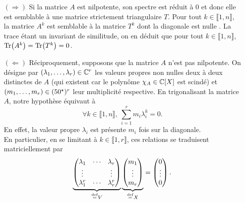 \begin{demo}
    \begin{itemize}
        \item[$(\Rightarrow)$] Si la matrice $A$ est nilpotente, son spectre est réduit à $0$ et donc elle est semblable à une matrice strictement triangulaire $T$. Pour tout $k \in \llbracket 1, n \rrbracket$, la matrice $A^k$ est semblable à la matrice $T^k$ dont la diagonale est nulle \note. La trace étant un invariant de similitude, on en déduit que pour tout $k \in \llbracket 1, n \rrbracket$, $\Tr(A^k) = \Tr(T^k) = 0$.
        \item[$(\Leftarrow)$] Réciproquement, supposons que la matrice $A$ n'est pas nilpotente. On désigne par $(\lambda_1, \dots, \lambda_r) \in \mathbb{C}^r$ les valeurs propres non nulles deux à deux distinctes de $A$ (qui existent car le polynôme $\chi_A \in \mathbb{C}[X]$ est scindé) et $(m_1, \dots, m_r) \in (50^\star)^r$ leur multiplicité respective. En trigonalisant la matrice $A$, notre hypothèse équivaut à
        $$\forall k \in \llbracket 1, n \rrbracket,\ \sum_{i=1}^r m_i \lambda_i^k = 0.$$
        En effet, la valeur propre $\lambda_i$ est présente $m_i$ fois sur la diagonale. \\
        En particulier, en se limitant à $k \in \llbracket 1, r \rrbracket$, ces relations se traduisent matriciellement par
        $$
        \underbrace{
        \begin{pmatrix}
        \lambda_1 & \cdots & \lambda_r \\
        \vdots & & \vdots \\
        \lambda_1^r & \cdots & \lambda_r^r
        \end{pmatrix}
        }_{\overset{\mathrm{\tiny def}}{=} V}
        \underbrace{
        \begin{pmatrix}
            m_1 \\ \vdots \\ m_r
        \end{pmatrix}
        }_{\overset{\mathrm{\tiny def}}{=} X}
        = 
        \begin{pmatrix}
        0 \\ \vdots \\ 0
        \end{pmatrix}.
        $$
        

\end{itemize}
\end{demo}
